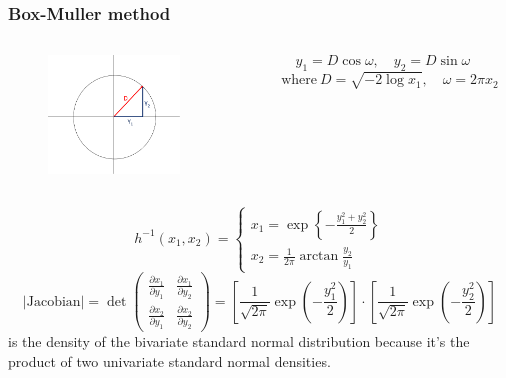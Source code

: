 \documentclass[10pt, serif, mathserif]{beamer}
\begin{document}
\begin{frame}
  \frametitle{Box-Muller method}
  \begin{columns}
    \begin{column}{3cm}
      \begin{figure}
        \centering
        \includegraphics[width=3.5cm,trim=10mm 10mm 10mm 10mm]{images/Picture1.png}
      \end{figure}
    \end{column}

    \begin{column}{5cm}
      \[ y_1 = D \cos \omega, \quad y_2 = D \sin \omega \quad \]
      \[ \text{where}\ D = \sqrt{-2 \log x_1}, \quad \omega = 2\pi x_2 \]
    \end{column}
  \end{columns}
  
  \bigskip
  
  \[
    h^{-1}(x_1,x_2) = \begin{cases}
      x_1 = \exp{\left\{ -\frac{y_1^2 + y_2^2}{2} \right\}}       
      \\
      x_2 = \frac{1}{2\pi} \arctan \frac{y_2}{y_1}
    \end{cases}
  \]
  \[
  	|\text{Jacobian}| = \det \left(
  	  \begin{matrix}
  	    \frac{\partial x_1}{\partial y_1} & \frac{\partial x_1}{\partial y_2} \\
  	    \frac{\partial x_2}{\partial y_1} & \frac{\partial x_2}{\partial y_2} 
  	  \end{matrix}
  	\right) = 
  	\left[ 
  	  \frac{1}{\sqrt{2\pi}} \exp{\left(-\frac{y_1^2}{2}\right)}
  	\right]
  	\cdot
  	\left[
  	  \frac{1}{\sqrt{2\pi}} \exp{\left(-\frac{y_2^2}{2}\right)} 
  	\right]
  \]
  is the density of the bivariate standard normal distribution because it's the product of two univariate standard normal densities.
\end{frame}
\end{document}
